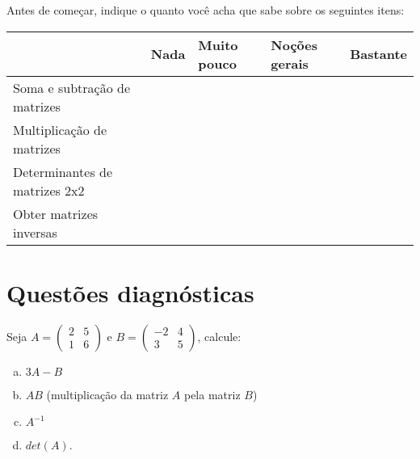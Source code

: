 \documentclass[main.tex]{subfiles}
\begin{document}
Antes de começar, indique o quanto você acha que sabe sobre os seguintes itens:

\begin{center}
 \begin{tabular}{|p{35mm}||p{15mm}|p{15mm}|p{15mm}|p{15mm}|} 
 \hline
   & Nada & Muito pouco & Noções gerais & Bastante\\
 \hline
 Soma e subtração de matrizes &  &  &  &  \\ 
 \hline
 Multiplicação de matrizes &  &  &  &  \\
 \hline
 Determinantes de matrizes 2x2 &  &  &  &  \\
 \hline
 Obter matrizes inversas &  &  &  &  \\
 \hline
\end{tabular}
\end{center}

\paraAmbos

\section{Questões diagnósticas}

\begin{diagnostico}
Seja $A=\begin{pmatrix}2 & 5 \\ 1 & 6\end{pmatrix}$ e $B=\begin{pmatrix}-2 & 4 \\ 3 & 5\end{pmatrix}$, calcule:
\begin{enumerate}[a)]
  \item $3A-B$
  
  \item $AB$ (multiplicação da matriz $A$ pela matriz $B$)

  \item $A^{-1}$
  
  \item $det(A)$.
\end{enumerate}
\end{diagnostico}
\end{document}
